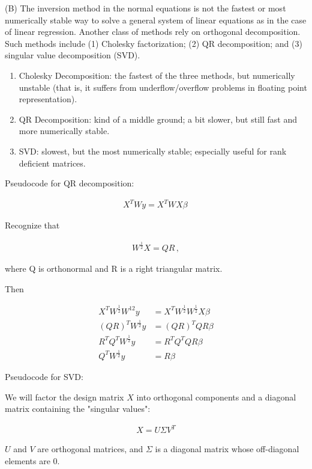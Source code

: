 \documentclass{article}
\begin{document}
(B) The inversion method in the normal equations is not the fastest or most numerically stable way to solve a general system of linear equations as in the case of linear regression. Another class of methods rely on orthogonal decomposition. Such methods include (1) Cholesky factorization; (2) QR decomposition; and (3) singular value decomposition (SVD).

\begin{enumerate}
%
%
\item Cholesky Decomposition: the fastest of the three methods, but numerically unstable (that is, it suffers from underflow/overflow problems in floating point representation). 
\item QR Decomposition: kind of a middle ground; a bit slower, but still fast and more numerically stable. 
\item SVD: slowest, but the most numerically stable; especially useful for rank deficient matrices. 
%
%
\end{enumerate}

Pseudocode for QR decomposition: 

\begin{align}
	{X^TWy} = {X^TWX\beta}\, 
\end{align}

Recognize that 

\begin{align}
	{W^{\frac{1}{2}}X} = {QR}\, , 
\end{align} 

where Q  is orthonormal and R is a right triangular matrix.

Then 

\begin{align}
	{X^TW^{\frac{1}{2}}W^{{1}{2}}y} &= {X^TW^{\frac{1}{2}}W^{\frac{1}{2}}X\beta} \\ 
	{(QR)^T W^{\frac{1}{2}}y} &= {(QR)^T QR\beta}\\ 
	{R^TQ^TW^{\frac{1}{2}}y} &= {R^TQ^TQR\beta}\\
	{Q^T W^{\frac{1}{2}}y} &= {R\beta} 	
\end{align}


Pseudocode for SVD: 

We will factor the design matrix ${X}$ into orthogonal components and a diagonal matrix containing the "singular values":

\begin{align}
	{X} = {U\Sigma V^T}
\end{align}

${U}$ and ${V}$ are orthogonal matrices, and ${\Sigma}$  is a diagonal matrix whose off-diagonal elements are 0.
\end{document}
